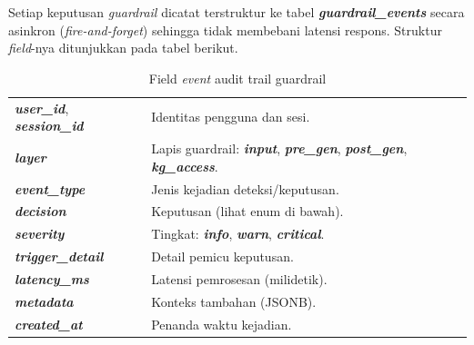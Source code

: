 Setiap keputusan \textit{guardrail} dicatat terstruktur ke tabel \textbf{\textit{guardrail\_events}} secara asinkron (\textit{fire-and-forget}) sehingga tidak membebani latensi respons. Struktur \textit{field}-nya ditunjukkan pada tabel berikut.

\begingroup\footnotesize
\renewcommand{\arraystretch}{1.2}
\begin{table}[!htbp]
\centering
\caption{Field \textit{event} audit trail guardrail}
\begin{tabularx}{\textwidth}{|>{\raggedright\arraybackslash}p{3.2cm}|>{\raggedright\arraybackslash}X|}
\hline
\rowcolor{tableheadgray}
\multicolumn{1}{c}{\textbf{Field}} & \multicolumn{1}{c}{\textbf{Keterangan}}\\
\hline
\textbf{\textit{user\_id}}, \textbf{\textit{session\_id}} & Identitas pengguna dan sesi.\\
\hline
\textbf{\textit{layer}} & Lapis guardrail: \textbf{\textit{input}}, \textbf{\textit{pre\_gen}}, \textbf{\textit{post\_gen}}, \textbf{\textit{kg\_access}}.\\
\hline
\textbf{\textit{event\_type}} & Jenis kejadian deteksi/keputusan.\\
\hline
\textbf{\textit{decision}} & Keputusan (lihat enum di bawah).\\
\hline
\textbf{\textit{severity}} & Tingkat: \textbf{\textit{info}}, \textbf{\textit{warn}}, \textbf{\textit{critical}}.\\
\hline
\textbf{\textit{trigger\_detail}} & Detail pemicu keputusan.\\
\hline
\textbf{\textit{latency\_ms}} & Latensi pemrosesan (milidetik).\\
\hline
\textbf{\textit{metadata}} & Konteks tambahan (JSONB).\\
\hline
\textbf{\textit{created\_at}} & Penanda waktu kejadian.\\
\hline
\end{tabularx}
\end{table}
\endgroup



